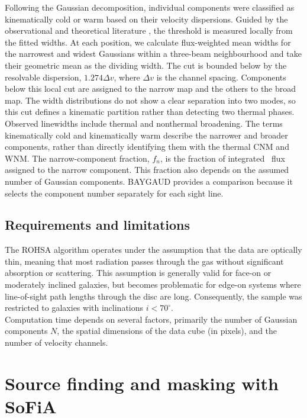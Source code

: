 Following the Gaussian decomposition, individual components were classified as kinematically cold or warm based on their velocity dispersions. Guided by the observational and theoretical literature \citep{Heiles2003a, Ianjamasimanana2012, Park2025}, the threshold is measured locally from the fitted widths. At each position, we calculate flux-weighted mean widths for the narrowest and widest Gaussians within a three-beam neighbourhood and take their geometric mean as the dividing width. The cut is bounded below by the resolvable dispersion, $1.274\Delta v$, where $\Delta v$ is the channel spacing. Components below this local cut are assigned to the narrow map and the others to the broad map. The width distributions do not show a clear separation into two modes, so this cut defines a kinematic partition rather than detecting two thermal phases.\\\indent
Observed linewidths include thermal and nonthermal broadening. The terms kinematically cold and kinematically warm describe the narrower and broader components, rather than directly identifying them with the thermal CNM and WNM. The narrow-component fraction, $f_n$, is the fraction of integrated \HI\ flux assigned to the narrow component. This fraction also depends on the assumed number of Gaussian components. BAYGAUD provides a comparison because it selects the component number separately for each sight line.

\subsection{Requirements and limitations}

The ROHSA algorithm operates under the assumption that the data are optically thin, meaning that most radiation passes through the gas without significant absorption or scattering. This assumption is generally valid for face-on or moderately inclined galaxies, but becomes problematic for edge-on systems where line-of-sight path lengths through the disc are long. Consequently, the sample was restricted to galaxies with inclinations $i < 70^\circ$.\\\indent
Computation time depends on several factors, primarily the number of Gaussian components $N$, the spatial dimensions of the data cube (in pixels), and the number of velocity channels.


\section{Source finding and masking with SoFiA}
\label{sec:sofia}

